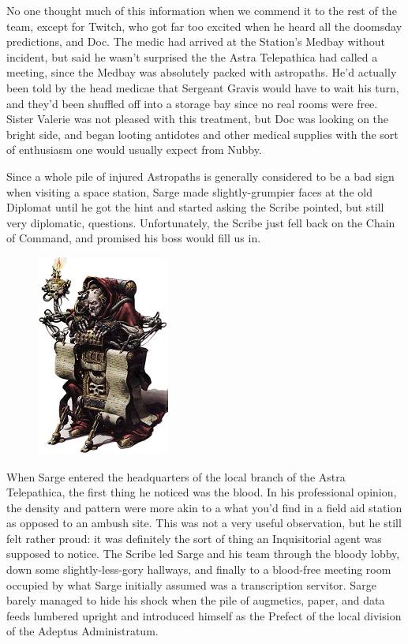 No one thought much of this information when we commend it to the rest of the team, except for Twitch, who got far too excited when he heard all the doomsday predictions, and Doc. 
The medic had arrived at the Station's Medbay without incident, but said he wasn't surprised the the Astra Telepathica had called a meeting, since the Medbay was absolutely packed with astropaths. 
He'd actually been told by the head medicae that Sergeant Gravis would have to wait his turn, and they'd been shuffled off into a storage bay since no real rooms were free. 
Sister Valerie was not pleased with this treatment, but Doc was looking on the bright side, and began looting antidotes and other medical supplies with the sort of enthusiasm one would usually expect from Nubby.

Since a whole pile of injured Astropaths is generally considered to be a bad sign when visiting a space station, Sarge made slightly-grumpier faces at the old Diplomat until he got the hint and started asking the Scribe pointed, but still very diplomatic, questions. 
Unfortunately, the Scribe just fell back on the Chain of Command, and promised his boss would fill us in.

\begin{figure}
	\begin{center}
		\includegraphics[width=\figwidth]{pics/14/11.png}
	\end{center}
\end{figure}
When Sarge entered the headquarters of the local branch of the Astra Telepathica, the first thing he noticed was the blood. 
In his professional opinion, the density and pattern were more akin to a what you'd find in a field aid station as opposed to an ambush site. 
This was not a very useful observation, but he still felt rather proud: 
it was definitely the sort of thing an Inquisitorial agent was supposed to notice. 
The Scribe led Sarge and his team through the bloody lobby, down some slightly-less-gory hallways, and finally to a blood-free meeting room occupied by what Sarge initially assumed was a transcription servitor. 
Sarge barely managed to hide his shock when the pile of augmetics, paper, and data feeds lumbered upright and introduced himself as the Prefect of the local division of the Adeptus Administratum.


